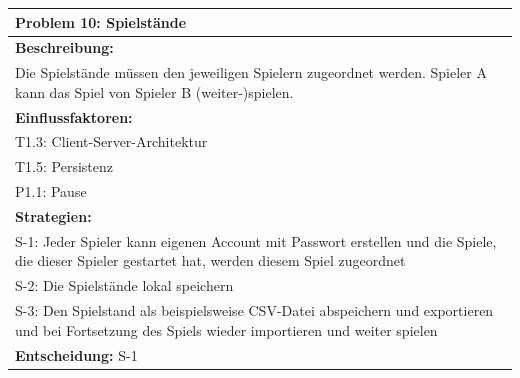 \documentclass[fontsize=12pt,paper=a4,twoside]{scrartcl}
\begin{document}
\begin{longtable}{|p{15cm}|}
\hline
Problem 10: Spielstände                                                                     
\\ \hline                                                                                                                                                                                                                                                                                                                                                                                                                                                                                                                                                        
\textbf{Beschreibung:} \\
Die Spielstände müssen den jeweiligen Spielern zugeordnet werden. Spieler A kann das Spiel von Spieler B (weiter-)spielen.
\\ \hline
\textbf{Einflussfaktoren:} \\
T1.3: Client-Server-Architektur\\
T1.5: Persistenz \\
P1.1: Pause
\\ \hline
\textbf{Strategien:} \\
S-1: Jeder Spieler kann eigenen Account mit Passwort erstellen und die Spiele, die dieser Spieler gestartet hat, werden diesem Spiel zugeordnet \\
S-2: Die Spielstände lokal speichern \\
S-3: Den Spielstand als beispielsweise CSV-Datei abspeichern und exportieren und bei Fortsetzung des Spiels wieder importieren und weiter spielen
 \\ \hline
 \textbf{Entscheidung:} S-1
\\ \hline
\end{longtable}
\end{document}
